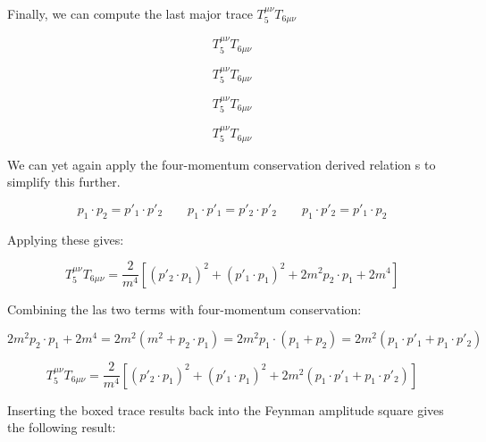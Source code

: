 \documentclass[a4]{article}
\begin{document}
    Finally, we can compute the last major trace $T_5^{\mu \nu} T_{6 \mu \nu}$

    \begin{equation}
        T_5^{\mu \nu} T_{6 \mu \nu}
    \end{equation}

    \begin{equation}
        T_5^{\mu \nu} T_{6 \mu \nu}
    \end{equation}

    \begin{equation}
        T_5^{\mu \nu} T_{6 \mu \nu}
    \end{equation}

    \begin{equation}
        T_5^{\mu \nu} T_{6 \mu \nu}
    \end{equation}

    We can yet again apply the four-momentum conservation derived relation s to simplify this further.

    \begin{equation}
        p_1 \cdot p_2 = p'_1 \cdot p'_2 \qquad p_1 \cdot p'_1 = p'_2 \cdot p'_2 \qquad p_1 \cdot p'_2 = p'_1 \cdot p_2
    \end{equation}

    Applying these gives:

    \begin{equation}
        T_5^{\mu \nu} T_{6 \mu \nu} = \frac{2}{m^4} [(p'_2 \cdot p_1)^2 + (p'_1 \cdot p_1)^2 + 2 m^2 p_2 \cdot p_1 + 2 m^4]
    \end{equation}

    Combining the las two terms with four-momentum conservation:

    \begin{equation}
        2 m^2 p_2 \cdot p_1 + 2 m^4 = 2 m^2 (m^2 + p_2 \cdot p_1) = 2 m^2 p_1 \cdot (p_1 + p_2) = 2 m^2 (p_1 \cdot p'_1 + p_1 \cdot p'_2)
    \end{equation}

    \begin{framed}
        \begin{equation}
            T_5^{\mu \nu} T_{6 \mu \nu} = \frac{2}{m^4} [(p'_2 \cdot p_1)^2 + (p'_1 \cdot p_1)^2 + 2 m^2 (p_1 \cdot p'_1 + p_1 \cdot p'_2)]
        \end{equation}
    \end{framed}

    Inserting the boxed trace results back into the Feynman amplitude square gives the following result:
\end{document}

